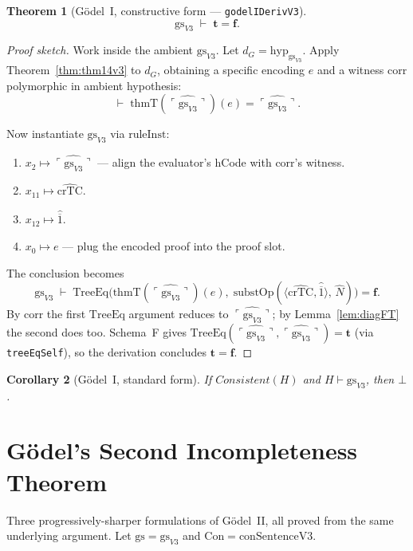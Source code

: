 \documentclass[11pt]{article}
\newtheorem{theorem}{Theorem}
\newtheorem{corollary}[theorem]{Corollary}
\newcommand{\pair}[2]{\langle #1, #2 \rangle}
\newcommand{\trueT}{\mathbf{t}}
\newcommand{\falseT}{\mathbf{f}}
\newcommand{\nat}[1]{\overline{#1}}
\newcommand{\code}[1]{\ulcorner #1 \urcorner}
\newcommand{\reify}[1]{\widehat{#1}}
\newcommand{\thmT}{\mathrm{thmT}}
\newcommand{\substOp}{\mathrm{substOp}}
\newcommand{\TreeEq}{\mathrm{TreeEq}}
\begin{document}
\begin{theorem}[G\"odel~I, constructive form --- \texttt{godelIDerivV3}]
\label{thm:godel1v3}
\[
  \mathrm{gs}_{V3} \;\vdash\; \trueT = \falseT.
\]
\end{theorem}

\begin{proof}[Proof sketch]
Work inside the ambient $\mathrm{gs}_{V3}$.  Let
$d_G = \mathrm{hyp}_{\mathrm{gs}_{V3}}$.  Apply
Theorem~\ref{thm:thm14v3} to $d_G$, obtaining a specific encoding
$e$ and a witness $\mathrm{corr}$ polymorphic in ambient hypothesis:
\[
  \vdash\; \thmT(\reify{\code{\mathrm{gs}_{V3}}})(e) = \reify{\code{\mathrm{gs}_{V3}}}.
\]

Now instantiate $\mathrm{gs}_{V3}$ via $\mathrm{ruleInst}$:
\begin{enumerate}
\item $x_2 \mapsto \reify{\code{\mathrm{gs}_{V3}}}$ --- align the
  evaluator's hCode with $\mathrm{corr}$'s witness.
\item $x_{11} \mapsto \reify{\mathrm{crTC}}$.
\item $x_{12} \mapsto \reify{\nat{1}}$.
\item $x_0 \mapsto e$ --- plug the encoded proof into the
  proof slot.
\end{enumerate}

The conclusion becomes
\[
  \mathrm{gs}_{V3} \;\vdash\;
  \TreeEq\bigl(\thmT(\reify{\code{\mathrm{gs}_{V3}}})(e),\;
               \substOp(\pair{\reify{\mathrm{crTC}}}{\reify{\nat{1}}},\, \reify{N})\bigr)
  = \falseT.
\]
By $\mathrm{corr}$ the first $\TreeEq$ argument reduces to
$\reify{\code{\mathrm{gs}_{V3}}}$; by Lemma~\ref{lem:diagFT} the
second does too.  Schema~F gives
$\TreeEq(\reify{\code{\mathrm{gs}_{V3}}}, \reify{\code{\mathrm{gs}_{V3}}}) = \trueT$
(via \texttt{treeEqSelf}), so the derivation concludes
$\trueT = \falseT$.
\end{proof}

\begin{corollary}[G\"odel~I, standard form]
If $\mathit{Consistent}(H)$ and $H \vdash \mathrm{gs}_{V3}$, then $\bot$.
\end{corollary}

\section{G\"odel's Second Incompleteness Theorem}
\label{sec:godel2}

Three progressively-sharper formulations of G\"odel~II, all proved
from the same underlying argument.  Let $\mathrm{gs} = \mathrm{gs}_{V3}$
and $\mathrm{Con} = \mathrm{conSentenceV3}$.
\end{document}
